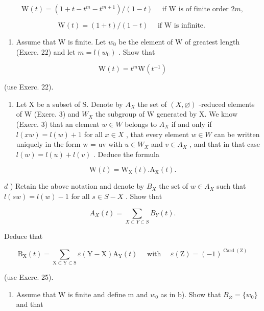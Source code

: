 \[
\mathrm{W} (t) = \left(1 + t - t ^ {m} - t ^ {m + 1}\right) / (1 - t) \quad \text { if   } \mathrm{W} \text {   is   of   finite   order   } 2 m,
\]

\[
\mathrm{W} (t) = (1 + t) / (1 - t) \quad \text { if   } \mathrm{W} \text {   is   infinite. }
\]

\begin{enumerate}
\def\labelenumi{\alph{enumi})}
\setcounter{enumi}{1}
\tightlist
\item
  Assume that W is finite. Let \(w_0\) be the element of W of greatest length (Exerc. 22) and let \(m = l(w_0)\) . Show that
\end{enumerate}

\[
\mathrm{W} (t) = t ^ {m} \mathrm{W} (t ^ {- 1})
\]

(use Exerc. 22).

\begin{enumerate}
\def\labelenumi{\alph{enumi})}
\setcounter{enumi}{2}
\tightlist
\item
  Let X be a subset of S. Denote by \(A_{X}\) the set of \((X,\varnothing)\) -reduced elements of W (Exerc. 3) and \(W_{X}\) the subgroup of W generated by X. We know (Exerc. 3) that an element \(w \in W\) belongs to \(A_{X}\) if and only if \(l(xw) = l(w) + 1\) for all \(x \in X\) , that every element \(w \in W\) can be written uniquely in the form w = uv with \(u \in W_{X}\) and \(v \in A_{X}\) , and that in that case \(l(w) = l(u) + l(v)\) . Deduce the formula
\end{enumerate}

\[
\mathrm{W} (t) = \mathrm{W} _ {\mathrm{X}} (t). \mathrm{A} _ {\mathrm{X}} (t).
\]

\(d\) ) Retain the above notation and denote by \(B_{X}\) the set of \(w\in A_X\) such that \(l(sw) = l(w) - 1\) for all \(s\in S - X\) . Show that

\[
A _ {X} (t) = \sum_ {X \subset Y \subset S} B _ {Y} (t).
\]

Deduce that

\[
\mathrm{B} _ {\mathrm{X}} (t) = \sum_ {\mathrm{X} \subset \mathrm{Y} \subset \mathrm{S}} \varepsilon (\mathrm{Y} - \mathrm{X}) \mathrm{A} _ {\mathrm{Y}} (t) \quad \text { with } \quad \varepsilon (\mathrm{Z}) = (- 1) ^ {\operatorname{Card} (\mathrm{Z})}
\]

(use Exerc. 25).

\begin{enumerate}
\def\labelenumi{\alph{enumi})}
\setcounter{enumi}{4}
\tightlist
\item
  Assume that W is finite and define m and \(w_{0}\) as in b). Show that \(B_{\varnothing} = \{w_{0}\}\) and that
\end{enumerate}

